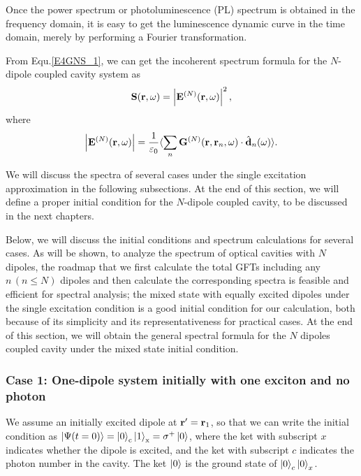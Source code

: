 Once the power spectrum or photoluminescence (PL) spectrum is obtained in the frequency domain, it is easy to get the luminescence dynamic curve in the time domain,
merely by performing a Fourier transformation.

From Equ.\eqref{E4GNS_1}, we can get the incoherent spectrum formula for the $N$-dipole coupled cavity system as
\begin{equation}
 \label{spectrum}
 \mathbf{S}(\mathbf{r},\omega)=\left|\mathbf{E}^{(N)}(\mathbf{r},\omega)\right|^2,
\end{equation}
where
\begin{equation}
 \left| \mathbf{E}^{(N)}(\mathbf{r},\omega)\right| =\frac{1}{\varepsilon_0}\langle \sum_n{\mathbf{G}^{(N)}(\mathbf{r},\mathbf{r}_n,\omega)\cdot \hat{\mathbf{d}}_n(\omega)}\rangle.
\end{equation}

We will discuss the spectra of several cases under the single excitation approximation in the following subsections. At the end of this section,
we will define a proper initial condition for the $N$-dipole coupled cavity,
to be discussed in the next chapters.

Below, we will discuss the initial conditions and spectrum calculations for several cases. As will be shown, to analyze the spectrum of optical cavities with $N$ dipoles, the roadmap that we first calculate the total GFTs including any $n\,(n\leq N)$ dipoles and then calculate the corresponding spectra is feasible and efficient for spectral analysis; the mixed state with equally excited dipoles under the single excitation condition is a good initial condition for our calculation, both because of its simplicity and its representativeness for practical cases. At the end of this section, we will obtain the general spectral formula for the $N$ dipoles coupled cavity under the mixed state initial condition.
\subsubsection{Case 1: One-dipole system initially with one exciton and no photon}

We assume an initially excited dipole at ${\bf r}'={\bf r}_1$,
so that we can write the initial
condition as
$\mathinner{|{\Psi(t=0)}\rangle}=\mathinner{|{0}\rangle}_{\rm c}\mathinner{|{1}\rangle}_{\rm x}=\sigma^{+}\mathinner{|{0}\rangle}$, where the ket with subscript $x$ indicates whether the dipole is excited, and the ket with subscript $c$ indicates the photon number in the cavity. The ket $\mathinner{|{0}\rangle}$ is the ground state of $\mathinner{|{0}\rangle}_c\mathinner{|{0}\rangle}_x$.

